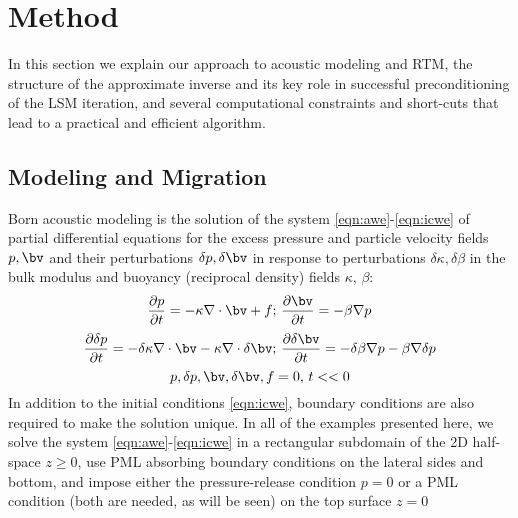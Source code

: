 \section{Method}
In this section we explain our approach to acoustic modeling and RTM, the
structure of the approximate inverse and its key role in successful
preconditioning of the LSM iteration, and several computational
constraints and short-cuts that lead to a practical and efficient
algorithm.

\subsection{Modeling and Migration}
Born acoustic modeling is the solution of the system
\ref{eqn:awe}-\ref{eqn:icwe} of partial differential equations for the
excess pressure and particle velocity fields $p, \bv$ and their
perturbations $\delta p, \delta \bv$ in response to perturbations
$\delta \kappa, \delta \beta$ in the bulk modulus and
buoyancy (reciprocal density) fields $\kappa$, $\beta$:
\begin{equation}
\label{eqn:awe}
\frac{\partial p}{\partial t} = - \kappa \nabla \cdot \bv + f;
\,\frac{\partial \bv}{\partial t} = - \beta \nabla p
\end{equation} 
\begin{equation}
\label{eqn:bwe}
\frac{\partial \delta p}{\partial t} = -\delta  \kappa \nabla \cdot
\bv - \kappa \nabla \cdot \delta \bv ;
\,\frac{\partial \delta \bv}{\partial t} = - \delta \beta \nabla p -
\beta \nabla \delta p
\end{equation} 
\begin{equation}
\label{eqn:icwe}
p, \delta p, \bv, \delta \bv, f =0,\, t<<0
\end{equation}
In addition to the initial conditions \ref{eqn:icwe}, boundary
conditions are also required to make the solution unique. In all of
the examples presented here, we solve the system
\ref{eqn:awe}-\ref{eqn:icwe} in a rectangular subdomain of the 2D
half-space $z \ge 0$, use PML absorbing boundary conditions \cite[]{Habashy:07} on the
lateral sides and bottom, and impose either the pressure-release
condition $p=0$ or a PML condition (both are needed, as will be seen)
on the top surface $z=0$ 

